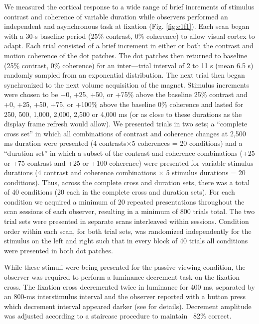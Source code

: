 \documentclass{report}
\begin{document}
We measured the cortical response to a wide range of brief increments of stimulus contrast and coherence of variable duration while observers performed an independent and asynchronous task at fixation (Fig. \ref{fig:c1f1}). Each scan began with a 30-s baseline period (25\% contrast, 0\% coherence) to allow visual cortex to adapt. Each trial consisted of a brief increment in either or both the contrast and motion coherence of the dot patches. The dot patches then returned to baseline (25\% contrast, 0\% coherence) for an inter---trial interval of 2 to 11 s (mean 6.5 s) randomly sampled from an exponential distribution. The next trial then began synchronized to the next volume acquisition of the magnet. Stimulus increments were chosen to be +0, +25, +50, or +75\% above the baseline 25\% contrast and +0, +25, +50, +75, or +100\% above the baseline 0\% coherence and lasted for 250, 500, 1,000, 2,000, 2,500 or 4,000 ms (or as close to these durations as the display frame refresh would allow). We presented trials in two sets; a “complete cross set” in which all combinations of contrast and coherence changes at 2,500 ms duration were presented (4 contrasts×5 coherences = 20 conditions) and a “duration set” in which a subset of the contrast and coherence combinations (+25 or +75 contrast and +25 or +100 coherence) were presented for variable stimulus durations (4 contrast and coherence combinations $\times$ 5 stimulus durations = 20 conditions). Thus, across the complete cross and duration sets, there was a total of 40 conditions (20 each in the complete cross and duration sets). For each condition we acquired a minimum of 20 repeated presentations throughout the scan sessions of each observer, resulting in a minimum of 800 trials total. The two trial sets were presented in separate scans interleaved within sessions. Condition order within each scan, for both trial sets, was randomized independently for the stimulus on the left and right such that in every block of 40 trials all conditions were presented in both dot patches.

While these stimuli were being presented for the passive viewing condition, the observer was required to perform a luminance decrement task on the fixation cross. The fixation cross decremented twice in luminance for 400 ms, separated by an 800-ms interstimulus interval and the observer reported with a button press which decrement interval appeared darker (see \citet{Gardner2008-yx} for details). Decrement amplitude was adjusted according to a staircase procedure to maintain ~82\% correct.
\end{document}
